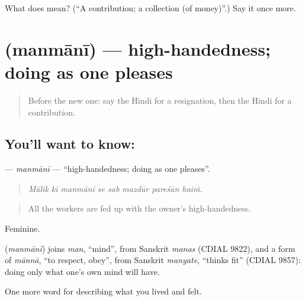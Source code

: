 \begin{tcolorbox}[breakable,colback=teal!4,colframe=teal!35!black,title={Before you move on}]
What does  mean? (\textquotedblleft{}A contribution; a collection (of money)\textquotedblright{}.) Say it once more.
\end{tcolorbox}
\section[\texorpdfstring{\hi{मनमानी} (manmānī)}{मनमानी (manmānī)}]{ (manmānī) — high-handedness; doing as one pleases}

\label{lesson:HI-C509-manmani}



\begin{quote}
Before the new one: say the Hindi for a resignation, then the Hindi for a contribution.
\end{quote}

\subsection*{You'll want to know: }
\textbf{} — \emph{manmānī} — \textquotedblleft{}high-handedness; doing as one pleases\textquotedblright{}.

\begin{quote}
       
\end{quote}

\begin{quote}
\emph{Mālik kī manmānī se sab mazdūr pareśān haiṁ.}
\end{quote}

\begin{quote}
All the workers are fed up with the owner's high-handedness.
\end{quote}

Feminine.

\begin{cousinweb}
\textbf{} (\emph{manmānī}) joins \emph{man}, \textquotedblleft{}mind\textquotedblright{}, from Sanskrit \emph{manas} (CDIAL 9822), and a form of \emph{mānnā}, \textquotedblleft{}to respect, obey\textquotedblright{}, from Sanskrit \emph{manyate}, \textquotedblleft{}thinks fit\textquotedblright{} (CDIAL 9857): doing only what one's own mind will have.
\end{cousinweb}

\begin{grammarlens}[title={What you've built}]
One more word for describing what you lived and felt.
\end{grammarlens}

